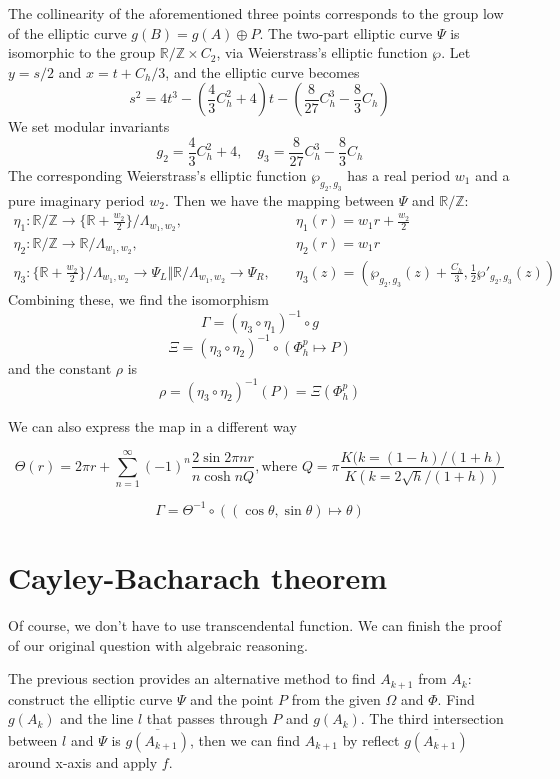 \documentclass[]{article}
\begin{document}
 The collinearity of the aforementioned three points corresponds to the group low of the elliptic curve $g(B) = g(A) \oplus P$. The two-part elliptic curve $\Psi$ is isomorphic to the group $\mathbb{R}/\mathbb{Z} \times C_2$, via Weierstrass's elliptic function $\wp$. Let $y = s/2$ and $x=t+C_h/3$, and the elliptic curve becomes
 \[
 s^2 = 4t^3-\left(\frac{4}{3}C_h^2+4\right)t-\left(\frac{8}{27}C_h^3-\frac{8}{3}C_h\right)
 \]
 We set modular invariants
 \[
 g_2 = \frac{4}{3}C_h^2+4,\quad g_3 = \frac{8}{27}C_h^3-\frac{8}{3}C_h
 \]
 The corresponding Weierstrass's elliptic function $\wp_{g_2,g_3}$ has a real period $w_1$ and a pure imaginary period $w_2$. Then we have the mapping between $\Psi$ and $\mathbb{R}/\mathbb{Z}$:
\begin{align*}
 \eta_1: \mathbb{R}/\mathbb{Z}\to\{\mathbb{R}+\frac{w_2}{2}\}/\Lambda_{w_1,w_2},& \quad  \eta_1(r) = w_1 r + \frac{w_2}{2}\\
 \eta_2: \mathbb{R}/\mathbb{Z}\to\mathbb{R}/\Lambda_{w_1,w_2},& \quad  \eta_2(r) = w_1 r\\
 \eta_3: \{\mathbb{R}+\frac{w_2}{2}\}/\Lambda_{w_1,w_2}\to\Psi_L\Big\Vert\mathbb{R}/\Lambda_{w_1,w_2}\to\Psi_R,&\quad \eta_3(z) = \left(\wp_{g_2,g_3}(z)+\frac{C_h}{3}, \frac{1}{2}\wp'_{g_2,g_3}(z)\right)
\end{align*}
Combining these, we find the isomorphism  \[
\Gamma = (\eta_3  \circ \eta_1)^{-1} \circ g\]
\[
\Xi = (\eta_3  \circ \eta_2)^{-1} \circ (\Phi_h^p \mapsto P)
\]
and the constant $\rho$ is
\[
\rho =(\eta_3  \circ \eta_2)^{-1}(P) =  \Xi(\Phi_h^p)
\]

We can also express the map in a different way

\[
\Theta(r) = 2\pi r + \sum_{n=1}^\infty (-1)^n\frac{2 \sin 2\pi nr}{n\cosh n Q }, \mbox{where } Q = \pi\frac{K(k=(1-h)/(1+h)}{K(k=2\sqrt{h}/(1+h))}
\]

\[
\Gamma = \Theta^{-1} \circ ((\cos\theta, \sin\theta) \mapsto \theta)
\]
 
\section{Cayley-Bacharach theorem}
 
 Of course, we don't have to use transcendental function. We can finish the proof of our original question with algebraic reasoning. 
 
 The previous section provides an alternative method to find $A_{k+1}$ from $A_k$: construct the elliptic curve $\Psi$ and the point $P$ from the given $\Omega$ and $\Phi$. Find $g(A_k)$ and the line $l$ that passes through $P$ and $g(A_k)$. The third intersection between $l$ and $\Psi$ is $\overline{g(A_{k+1})}$, then we can find $A_{k+1}$ by reflect $\overline{g(A_{k+1})}$ around x-axis and apply $f$.
 
\end{document}
